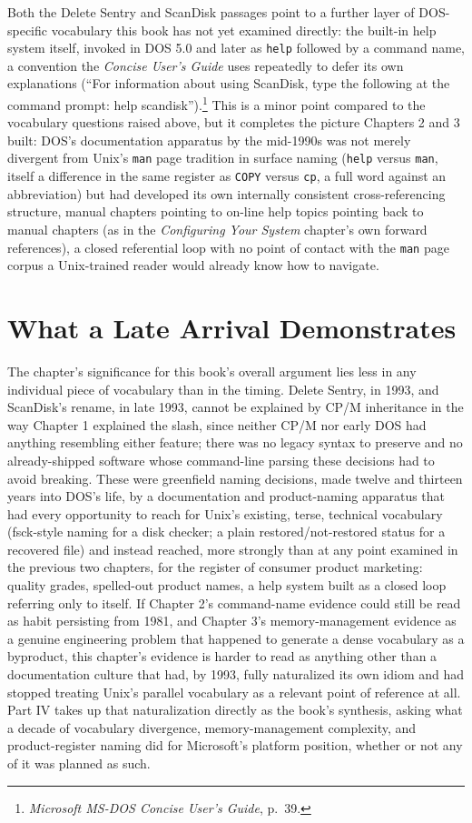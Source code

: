 \documentclass[11pt]{book}
\begin{document}
Both the Delete Sentry and ScanDisk passages point to a further layer of DOS-specific vocabulary this book has not yet examined directly: the built-in help system itself, invoked in DOS 5.0 and later as \texttt{help} followed by a command name, a convention the \emph{Concise User's Guide} uses repeatedly to defer its own explanations (\enquote{For information about using ScanDisk, type the following at the command prompt: help scandisk}).\footnote{\emph{Microsoft MS-DOS Concise User's Guide}, p.\ 39.} This is a minor point compared to the vocabulary questions raised above, but it completes the picture Chapters 2 and 3 built: DOS's documentation apparatus by the mid-1990s was not merely divergent from Unix's \texttt{man} page tradition in surface naming (\texttt{help} versus \texttt{man}, itself a difference in the same register as \texttt{COPY} versus \texttt{cp}, a full word against an abbreviation) but had developed its own internally consistent cross-referencing structure, manual chapters pointing to on-line help topics pointing back to manual chapters (as in the \emph{Configuring Your System} chapter's own forward references), a closed referential loop with no point of contact with the \texttt{man} page corpus a Unix-trained reader would already know how to navigate.

\section{What a Late Arrival Demonstrates}

The chapter's significance for this book's overall argument lies less in any individual piece of vocabulary than in the timing. Delete Sentry, in 1993, and ScanDisk's rename, in late 1993, cannot be explained by CP/M inheritance in the way Chapter 1 explained the slash, since neither CP/M nor early DOS had anything resembling either feature; there was no legacy syntax to preserve and no already-shipped software whose command-line parsing these decisions had to avoid breaking. These were greenfield naming decisions, made twelve and thirteen years into DOS's life, by a documentation and product-naming apparatus that had every opportunity to reach for Unix's existing, terse, technical vocabulary (fsck-style naming for a disk checker; a plain restored/not-restored status for a recovered file) and instead reached, more strongly than at any point examined in the previous two chapters, for the register of consumer product marketing: quality grades, spelled-out product names, a help system built as a closed loop referring only to itself. If Chapter 2's command-name evidence could still be read as habit persisting from 1981, and Chapter 3's memory-management evidence as a genuine engineering problem that happened to generate a dense vocabulary as a byproduct, this chapter's evidence is harder to read as anything other than a documentation culture that had, by 1993, fully naturalized its own idiom and had stopped treating Unix's parallel vocabulary as a relevant point of reference at all. Part IV takes up that naturalization directly as the book's synthesis, asking what a decade of vocabulary divergence, memory-management complexity, and product-register naming did for Microsoft's platform position, whether or not any of it was planned as such.
\end{document}
